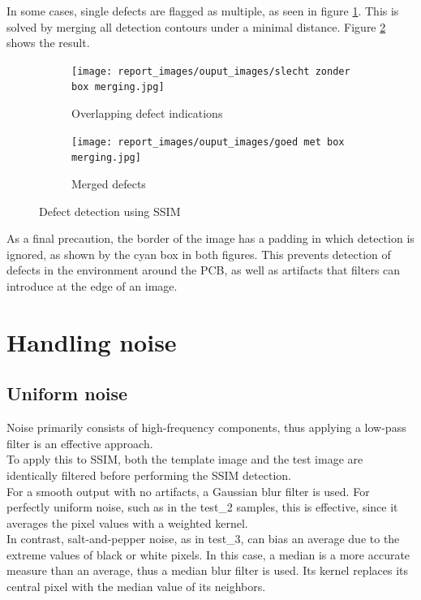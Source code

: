 \documentclass{report}
\begin{document}
In some cases, single defects are flagged as multiple, as seen in figure \ref{fig:BoxSlecht}. This is solved by merging all detection contours under a minimal distance. Figure \ref{fig:BoxGoed} shows the result.

\begin{figure}[H]
    \centering
    \begin{subfigure}[b]{0.45\linewidth}
        \centering
        \texttt{[image: report\_images/ouput\_images/slecht zonder box merging.jpg]}
        \caption{Overlapping defect indications}
        \label{fig:BoxSlecht}
    \end{subfigure}
    \hfill
    \begin{subfigure}[b]{0.45\linewidth}
        \centering
        \texttt{[image: report\_images/ouput\_images/goed met box merging.jpg]}
        \caption{Merged defects}
        \label{fig:BoxGoed}
    \end{subfigure}
    \caption{Defect detection using SSIM}
    \label{fig:DefectComparison}
\end{figure}

As a final precaution, the border of the image has a padding in which detection is ignored, as shown by the cyan box in both figures. This prevents detection of defects in the environment around the PCB, as well as artifacts that filters can introduce at the edge of an image.

\section{Handling noise}
\subsection{Uniform noise}

Noise primarily consists of high-frequency components, thus applying a low-pass filter is an effective approach.\\
To apply this to SSIM, both the template image and the test image are identically filtered before performing the SSIM detection.\\
\newline
For a smooth output with no artifacts, a Gaussian blur filter is used. For perfectly uniform noise, such as in the test\_2 samples, this is effective, since it averages the pixel values with a weighted kernel.\\

In contrast, salt-and-pepper noise, as in test\_3, can bias an average due to the extreme values of black or white pixels.
In this case, a median is a more accurate measure than an average, thus a median blur filter is used. Its kernel replaces its central pixel with the median value of its neighbors.
\end{document}
